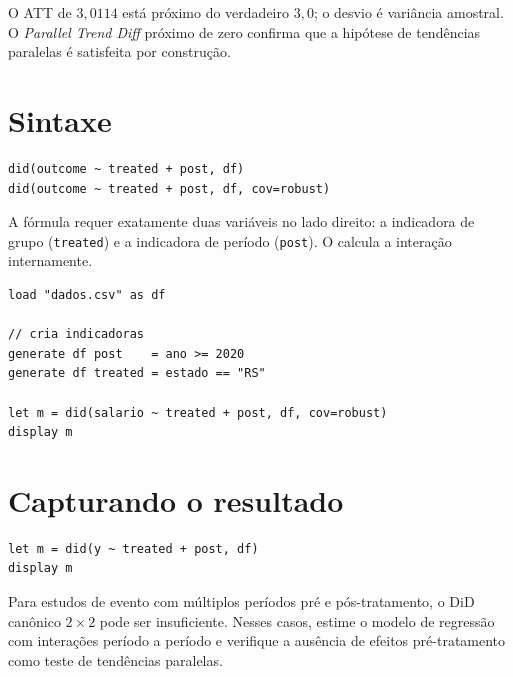 O ATT de $3{,}0114$ está próximo do verdadeiro $3{,}0$; o desvio é variância
amostral. O \emph{Parallel Trend Diff} próximo de zero confirma que a
hipótese de tendências paralelas é satisfeita por construção.

\section{Sintaxe}

\begin{lstlisting}
did(outcome ~ treated + post, df)
did(outcome ~ treated + post, df, cov=robust)
\end{lstlisting}

A fórmula requer exatamente duas variáveis no lado direito: a indicadora de
grupo (\lstinline{treated}) e a indicadora de período (\lstinline{post}).
O \hayashi{} calcula a interação internamente.

\begin{lstlisting}[caption={Fluxo típico de DiD}]
load "dados.csv" as df

// cria indicadoras
generate df post    = ano >= 2020
generate df treated = estado == "RS"

let m = did(salario ~ treated + post, df, cov=robust)
display m
\end{lstlisting}

\section{Capturando o resultado}

\begin{lstlisting}
let m = did(y ~ treated + post, df)
display m
\end{lstlisting}

\begin{nota}
  Para estudos de evento com múltiplos períodos pré e pós-tratamento,
  o DiD canônico $2\times 2$ pode ser insuficiente. Nesses casos,
  estime o modelo de regressão com interações período a período e
  verifique a ausência de efeitos pré-tratamento como teste de
  tendências paralelas.
\end{nota}
